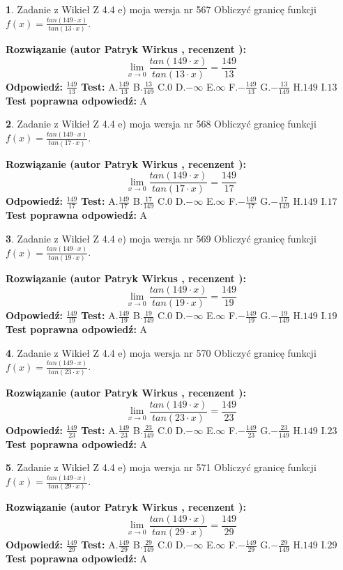 \documentclass[12pt, a4paper]{article}
\theoremstyle{definition} %
\newtheorem{zad}{}
\newcommand{\zadStart}[1]{\begin{zad}#1\newline}
\newcommand{\zadStop}{\end{zad}}
\newcommand{\rozwStart}[2]{\noindent \textbf{Rozwiązanie (autor #1 , recenzent #2): }\newline}
\newcommand{\rozwStop}{\newline}
\newcommand{\odpStart}{\noindent \textbf{Odpowiedź:}\newline}
\newcommand{\odpStop}{\newline}
\newcommand{\testStart}{\noindent \textbf{Test:}\newline}
\newcommand{\testStop}{\newline}
\newcommand{\kluczStart}{\noindent \textbf{Test poprawna odpowiedź:}\newline}
\newcommand{\kluczStop}{\newline}
\begin{document}
\zadStart{Zadanie z Wikieł Z 4.4 e) moja wersja nr 567}
Obliczyć granicę funkcji $f(x)=\frac{tan(149\cdot x)}{tan(13\cdot x)}$.
\zadStop
\rozwStart{Patryk Wirkus}{}
$$\lim\limits_{x\to 0}\frac{tan(149\cdot x)}{tan(13\cdot x)}=
\frac{149}{13}$$
\rozwStop
\odpStart
$\frac{149}{13}$
\odpStop
\testStart
A.$\frac{149}{13}$
B.$\frac{13}{149}$
C.$0$
D.$-\infty$
E.$\infty$
F.$-\frac{149}{13}$
G.$-\frac{13}{149}$
H.$149$
I.$13$
\testStop
\kluczStart
A
\kluczStop



\zadStart{Zadanie z Wikieł Z 4.4 e) moja wersja nr 568}
Obliczyć granicę funkcji $f(x)=\frac{tan(149\cdot x)}{tan(17\cdot x)}$.
\zadStop
\rozwStart{Patryk Wirkus}{}
$$\lim\limits_{x\to 0}\frac{tan(149\cdot x)}{tan(17\cdot x)}=
\frac{149}{17}$$
\rozwStop
\odpStart
$\frac{149}{17}$
\odpStop
\testStart
A.$\frac{149}{17}$
B.$\frac{17}{149}$
C.$0$
D.$-\infty$
E.$\infty$
F.$-\frac{149}{17}$
G.$-\frac{17}{149}$
H.$149$
I.$17$
\testStop
\kluczStart
A
\kluczStop



\zadStart{Zadanie z Wikieł Z 4.4 e) moja wersja nr 569}
Obliczyć granicę funkcji $f(x)=\frac{tan(149\cdot x)}{tan(19\cdot x)}$.
\zadStop
\rozwStart{Patryk Wirkus}{}
$$\lim\limits_{x\to 0}\frac{tan(149\cdot x)}{tan(19\cdot x)}=
\frac{149}{19}$$
\rozwStop
\odpStart
$\frac{149}{19}$
\odpStop
\testStart
A.$\frac{149}{19}$
B.$\frac{19}{149}$
C.$0$
D.$-\infty$
E.$\infty$
F.$-\frac{149}{19}$
G.$-\frac{19}{149}$
H.$149$
I.$19$
\testStop
\kluczStart
A
\kluczStop



\zadStart{Zadanie z Wikieł Z 4.4 e) moja wersja nr 570}
Obliczyć granicę funkcji $f(x)=\frac{tan(149\cdot x)}{tan(23\cdot x)}$.
\zadStop
\rozwStart{Patryk Wirkus}{}
$$\lim\limits_{x\to 0}\frac{tan(149\cdot x)}{tan(23\cdot x)}=
\frac{149}{23}$$
\rozwStop
\odpStart
$\frac{149}{23}$
\odpStop
\testStart
A.$\frac{149}{23}$
B.$\frac{23}{149}$
C.$0$
D.$-\infty$
E.$\infty$
F.$-\frac{149}{23}$
G.$-\frac{23}{149}$
H.$149$
I.$23$
\testStop
\kluczStart
A
\kluczStop



\zadStart{Zadanie z Wikieł Z 4.4 e) moja wersja nr 571}
Obliczyć granicę funkcji $f(x)=\frac{tan(149\cdot x)}{tan(29\cdot x)}$.
\zadStop
\rozwStart{Patryk Wirkus}{}
$$\lim\limits_{x\to 0}\frac{tan(149\cdot x)}{tan(29\cdot x)}=
\frac{149}{29}$$
\rozwStop
\odpStart
$\frac{149}{29}$
\odpStop
\testStart
A.$\frac{149}{29}$
B.$\frac{29}{149}$
C.$0$
D.$-\infty$
E.$\infty$
F.$-\frac{149}{29}$
G.$-\frac{29}{149}$
H.$149$
I.$29$
\testStop
\kluczStart
A
\kluczStop
\end{document}
